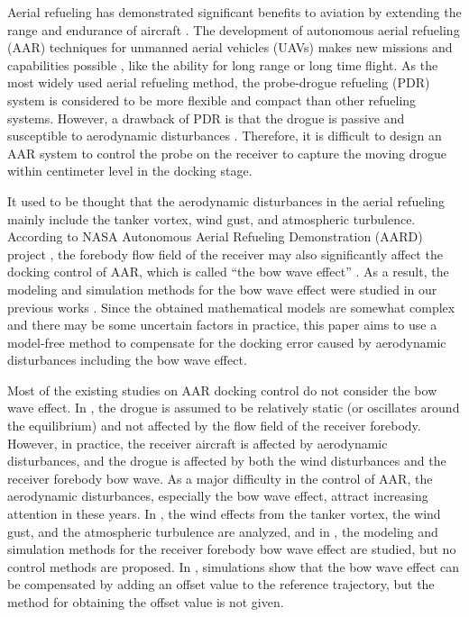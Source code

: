 Aerial refueling has demonstrated significant benefits to aviation
by extending the range and endurance of aircraft \cite{Nalepka-2005-1}.
The development of autonomous aerial refueling (AAR) techniques for
unmanned aerial vehicles (UAVs) makes new missions and capabilities
possible \cite{Dibley-2007-2}, like the ability for long range or
long time flight. As the most widely used aerial refueling method,
the probe-drogue refueling (PDR) system is considered to be more flexible
and compact than other refueling systems. However, a drawback of PDR
is that the drogue is passive and susceptible to aerodynamic disturbances
\cite{AAR-2014}. Therefore, it is difficult to design an AAR system
to control the probe on the receiver to capture the moving drogue
within centimeter level in the docking stage.

It used to be thought that the aerodynamic disturbances in the aerial
refueling mainly include the tanker vortex, wind gust, and atmospheric
turbulence. According to NASA Autonomous Aerial Refueling Demonstration
(AARD) project \cite{Dibley-2007-2}, the forebody flow field of the
receiver may also significantly affect the docking control of AAR,
which is called ``the bow wave effect'' \cite{Bhandari-2013-8}.
As a result, the modeling and simulation methods for the bow wave
effect were studied in our previous works \cite{dai2016modeling,wei2016drogue}.
Since the obtained mathematical models are somewhat complex and there
may be some uncertain factors in practice, this paper aims to use
a model-free method to compensate for the docking error caused by
aerodynamic disturbances including the bow wave effect.

Most of the existing studies on AAR docking control do not consider
the bow wave effect. In \cite{tandale2006trajectory,zhu2016vision,liu2017modeling},
the drogue is assumed to be relatively static (or oscillates around
the equilibrium) and not affected by the flow field of the receiver
forebody. However, in practice, the receiver aircraft is affected
by aerodynamic disturbances, and the drogue is affected by both the
wind disturbances and the receiver forebody bow wave. As a major difficulty
in the control of AAR, the aerodynamic disturbances, especially the
bow wave effect, attract increasing attention in these years. In \cite{Vortex-1,lee2013estimation},
the wind effects from the tanker vortex, the wind gust, and the atmospheric
turbulence are analyzed, and in \cite{dai2016modeling,wei2016drogue,Khan-2014-9},
the modeling and simulation methods for the receiver forebody bow
wave effect are studied, but no control methods are proposed. In \cite{Bhandari-2013-8},
simulations show that the bow wave effect can be compensated by adding
an offset value to the reference trajectory, but the method for obtaining
the offset value is not given.

